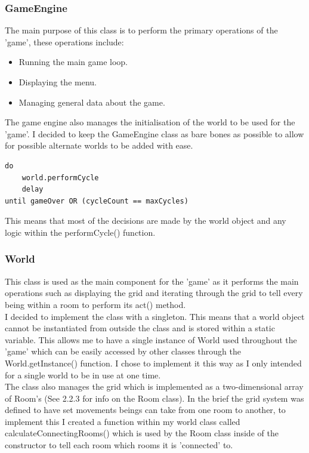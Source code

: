 \documentclass[12pt]{article}
\begin{document}
\subsubsection{GameEngine}
The main purpose of this class is to perform the primary operations of the 'game', these operations include:
\begin{itemize}
	\item Running the main game loop.
	\item Displaying the menu.
	\item Managing general data about the game.
\end{itemize}
The game engine also manages the initialisation of the world to be used for the 'game'. I decided to keep the GameEngine class as bare bones as possible to allow for possible alternate worlds to be added with ease. \\

\begin{lstlisting}[caption=Game loop, basicstyle=\small]
do
	world.performCycle
	delay
until gameOver OR (cycleCount == maxCycles)
\end{lstlisting}

This means that most of the decisions are made by the world object and any logic within the performCycle() function.

\subsubsection{World}
This class is used as the main component for the 'game' as it performs the main operations such as displaying the grid and iterating through the grid to tell every being within a room to perform its act() method. \\

I decided to implement the class with a singleton. This means that a world object cannot be instantiated from outside the class and is stored within a static variable. This allows me to have a single instance of World used throughout the 'game' which can be easily accessed by other classes through the World.getInstance() function. I chose  to implement it this way as I only intended for a single world to be in use at one time.\\

The class also manages the grid which is implemented as a two-dimensional array of Room's (See 2.2.3 for info on the Room class). In the brief the grid system was defined to have set movements beings can take from one room to another, to implement this I created a function within my world class called calculateConnectingRooms() which is used by the Room class inside of the constructor to tell each room which rooms it is 'connected' to.
\end{document}
